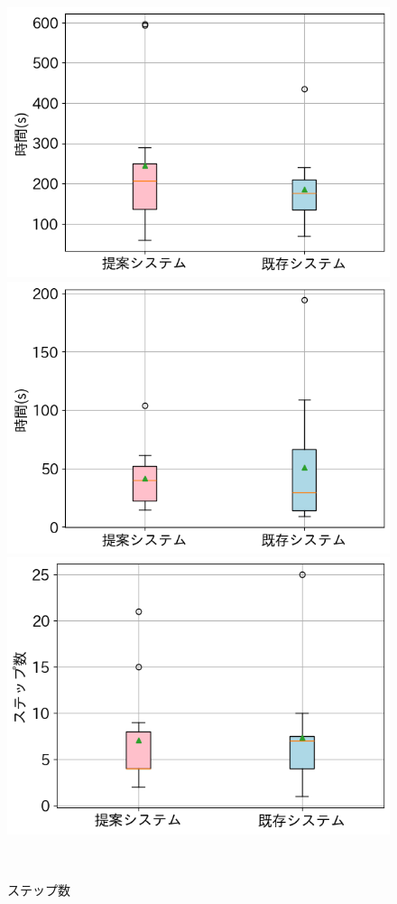 \documentclass[a4j,11pt]{article}
\makeatletter
\newcommand{\figcaption}[1]{\def\@captype{figure}\caption{#1}}
\makeatother
\begin{document}
{\begin{figure}[h]
 
    \begin{minipage}[b]{0.35\hsize}
      \centering
      \includegraphics[width=0.8\hsize]{./imgs/sofaAllTime.png}
            \figcaption{全時間}\label{fig:exp2AllTime}
     \end{minipage}
     \begin{minipage}[b]{0.35\hsize}
      \centering
      \includegraphics[width=0.8\hsize]{./imgs/sofaStepTime.png}
            \figcaption{1ステップ当たりの時間}\label{fig:exp2StepTime}
     \end{minipage}
     \begin{minipage}[b]{0.35\hsize}
      \centering
      \includegraphics[width=0.8\hsize]{./imgs/sofaStepCnt.png}
            \figcaption{ステップ数}\label{fig:exp2StepNum}
     \end{minipage}
 \\
 

\end{figure}}
\end{document}
